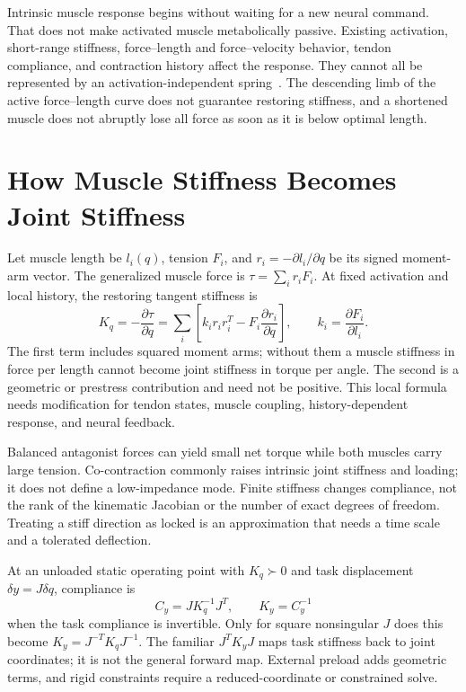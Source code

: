 Intrinsic muscle response begins without waiting for a new neural command.
That does not make activated muscle metabolically passive. Existing activation,
short-range stiffness, force--length and force--velocity behavior, tendon
compliance, and contraction history affect the response. They cannot all be
represented by an activation-independent spring~\cite{rack1974short}.
The descending limb of the active force--length curve does not guarantee
restoring stiffness, and a shortened muscle does not abruptly lose all force
as soon as it is below optimal length.

\section{How Muscle Stiffness Becomes Joint Stiffness}
\label{sec:pretensioning}

Let muscle length be $l_i(q)$, tension $F_i$, and
$r_i=-\partial l_i/\partial q$ be its signed moment-arm vector. The generalized
muscle force is $\tau=\sum_i r_iF_i$. At fixed activation and local history,
the restoring tangent stiffness is
\begin{equation}
K_q=-\frac{\partial\tau}{\partial q}
=\sum_i\left[k_i r_i r_i^T-F_i\frac{\partial r_i}{\partial q}\right],
\qquad k_i=\frac{\partial F_i}{\partial l_i}.
\label{eq:cocontraction_stiffness}
\end{equation}
The first term includes squared moment arms; without them a muscle stiffness
in force per length cannot become joint stiffness in torque per angle. The
second is a geometric or prestress contribution and need not be positive.
This local formula needs modification for tendon states, muscle coupling,
history-dependent response, and neural feedback.

Balanced antagonist forces can yield small net torque while both muscles carry
large tension. Co-contraction commonly raises intrinsic joint stiffness and
loading; it does not define a low-impedance mode. Finite stiffness changes
compliance, not the rank of the kinematic Jacobian or the number of exact
degrees of freedom. Treating a stiff direction as locked is an approximation
that needs a time scale and a tolerated deflection.

At an unloaded static operating point with $K_q\succ0$ and task displacement
$\delta y=J\delta q$, compliance is
\begin{equation}
C_y=J K_q^{-1}J^T,\qquad K_y=C_y^{-1}
\label{eq:effective_impedance}
\end{equation}
when the task compliance is invertible. Only for square nonsingular $J$ does
this become $K_y=J^{-T}K_qJ^{-1}$. The familiar $J^TK_yJ$ maps task stiffness
back to joint coordinates; it is not the general forward map. External
preload adds geometric terms, and rigid constraints require a reduced-coordinate
or constrained solve.

